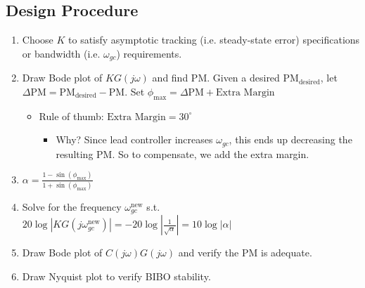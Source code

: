 \subsection{Design Procedure}
\begin{process}
    \begin{enumerate}
        \item Choose $K$ to satisfy asymptotic tracking (i.e. steady-state error) specifications or bandwidth (i.e. $\omega_{gc}$) requirements.
        \item Draw Bode plot of $K G(j \omega)$ and find PM. Given a desired $\text{PM}_{\text{desired}}$, let $\Delta \text{PM} = \text{PM}_{\text{desired}} - \text{PM}$. Set $\phi_{\max} = \Delta \text{PM} + \text{Extra Margin}$
        \begin{itemize}
            \item Rule of thumb: $\text{Extra Margin} = 30^\circ$
            \begin{itemize}
                \item Why? Since lead controller increases $\omega_{gc}$, this ends up decreasing the resulting PM. So to compensate, we add the extra margin. 
            \end{itemize}
        \end{itemize}
        \item $\alpha = \frac{1 - \sin(\phi_{\max})}{1 + \sin(\phi_{\max})}$
        \item Solve for the frequency $\omega_{gc}^{\text{new}}$ s.t. $20 \log |K G(j \omega_{gc}^{\text{new}})| = - 20 \log \left| \frac{1}{\sqrt{\alpha}} \right| = 10 \log |\alpha|$ 
        \item Draw Bode plot of $C(j \omega) G(j \omega)$ and verify the PM is adequate. 
        \item Draw Nyquist plot to verify BIBO stability. 
    \end{enumerate}
\end{process}


